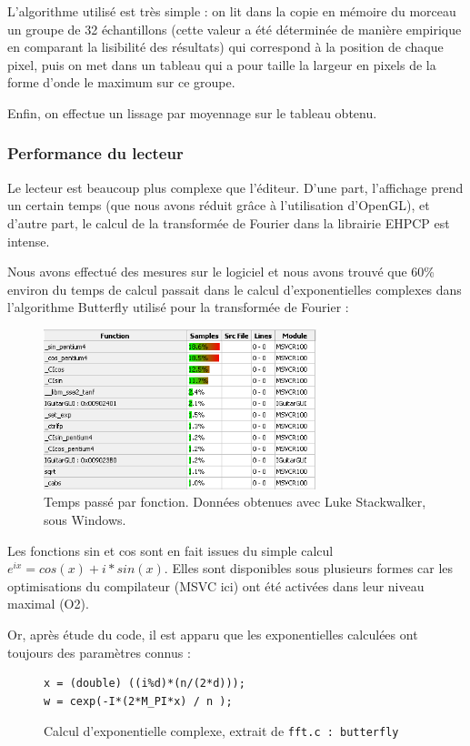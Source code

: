 L'algorithme utilisé est très simple : on lit dans la copie en mémoire du morceau un groupe de 32 échantillons
(cette valeur a été déterminée de manière empirique en comparant la lisibilité des résultats) qui correspond à la position de
chaque pixel, puis on met dans un tableau qui a pour taille la largeur en pixels de la forme d'onde le maximum sur ce groupe.

Enfin, on effectue un lissage par moyennage sur le tableau obtenu.

\subsubsection{Performance du lecteur}

Le lecteur est beaucoup plus complexe que l'éditeur. D'une part, l'affichage prend un certain temps (que nous avons réduit grâce à l'utilisation d'OpenGL),
et d'autre part, le calcul de la transformée de Fourier dans la librairie EHPCP est intense.

Nous avons effectué des mesures sur le logiciel et nous avons trouvé que 60\% environ du temps de calcul
passait dans le calcul d'exponentielles complexes dans l'algorithme Butterfly utilisé pour la transformée de Fourier :

\begin{figure}[H]
\begin{center}
\includegraphics[width=300px]{sincos.png}
\caption{Temps passé par fonction. Données obtenues avec Luke Stackwalker, sous Windows.}
\label{player_performance}
\end{center}
\end{figure}

Les fonctions sin et cos sont en fait issues du simple calcul $e^{ix} = cos(x) + i*sin(x)$.
Elles sont disponibles sous plusieurs formes car les optimisations du compilateur (\ac{MSVC} ici) ont été activées dans leur niveau maximal (O2).

Or, après étude du code, il est apparu que les exponentielles calculées ont toujours des paramètres connus :
\begin{figure}[H]
\begin{lstlisting}
x = (double) ((i%d)*(n/(2*d)));
w = cexp(-I*(2*M_PI*x) / n );
\end{lstlisting}
\caption{Calcul d'exponentielle complexe, extrait de \texttt{fft.c : butterfly}}
\label{api_cexp}
\end{figure}

